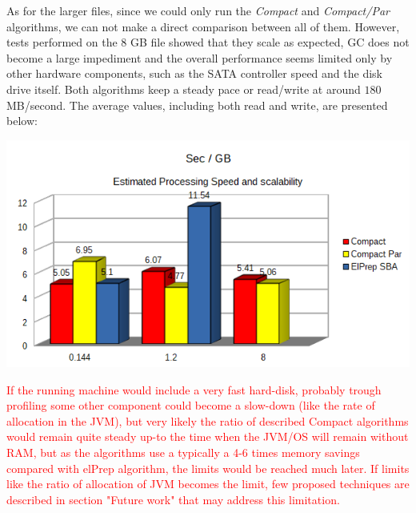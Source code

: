 \documentclass[a4paper,twoside]{article}
\begin{document}
As for the larger files, since we could only run the {\it Compact} and {\it Compact/Par} algorithms, we can not make a direct comparison between all of them. However, tests performed on the $8$ GB file showed that they scale as expected, GC does not become a large impediment and the overall performance seems limited only by other hardware components, such as the SATA controller speed and the disk drive itself.
Both algorithms keep a steady pace or read/write at around $180$ MB/second.
The average values, including both read and write, are presented below:

\begin{center}
	\includegraphics[scale=0.5]{images/seconds_per_gb_ryzen.png}
\end{center}


\textcolor{red}{
If the running machine would include a very fast hard-disk, probably trough profiling some other component could become a slow-down (like the rate of allocation in the JVM), but very likely
the ratio of described Compact algorithms would remain quite steady up-to the time when the JVM/OS will remain without RAM, but as the algorithms use a typically a 4-6 times memory 
savings compared with elPrep algorithm, the limits would be reached much later.
If limits like the ratio of allocation of JVM becomes the limit, few proposed techniques are described in section "Future work" that may address this limitation.
}
\end{document}

